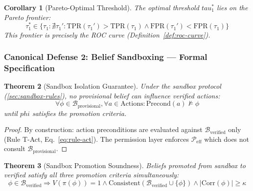 \documentclass[
]{article}
\newtheorem{theorem}{Theorem}[section]
\newtheorem{corollary}[theorem]{Corollary}
\begin{document}
\begin{corollary}[Pareto-Optimal Threshold]
\label{cor:pareto-threshold}
The optimal threshold $tau_1^*$ lies on the Pareto frontier:
\begin{equation}
\label{eq:pareto-threshold}
\tau_1^* \in \{\tau_1 : \nexists \tau_1': \text{TPR}(\tau_1') > \text{TPR}(\tau_1) \land \text{FPR}(\tau_1') < \text{FPR}(\tau_1)\}
\end{equation}
This frontier is precisely the ROC curve (Definition~\ref{def:roc-curve}).
\end{corollary}

\subsubsection{Canonical Defense 2: Belief Sandboxing --- Formal
Specification}\label{canonical-defense-2-belief-sandboxing-formal-specification}

\begin{theorem}[Sandbox Isolation Guarantee]
\label{thm:sandbox-isolation}
Under the sandbox protocol (\cref{sec:sandbox-rules}), no provisional belief can influence verified actions:
\begin{equation}
\label{eq:sandbox-isolation}
\forall \phi \in \mathcal{B}_{\text{provisional}}, \forall a \in \text{Actions}: \text{Precond}(a) \not\models \phi
\end{equation}
until $phi$ satisfies the promotion criteria.
\end{theorem}

\begin{proof}
By construction: action preconditions are evaluated against $\mathcal{B}_{\text{verified}}$ only (Rule T-Act, Eq.~\ref{eq:rule-act}). The permission layer enforces $\mathcal{P}_{\text{eff}}$ which does not consult $\mathcal{B}_{\text{provisional}}$.
\end{proof}

\begin{theorem}[Sandbox Promotion Soundness]
\label{thm:sandbox-soundness}
Beliefs promoted from sandbox to verified satisfy all three promotion criteria simultaneously:
\begin{equation}
\label{eq:sandbox-soundness}
\phi \in \mathcal{B}_{\text{verified}} \Rightarrow V(\pi(\phi)) = 1 \land \text{Consistent}(\mathcal{B}_{\text{verified}} \cup \{\phi\}) \land |\text{Corr}(\phi)| \geq \kappa
\end{equation}
\end{theorem}
\end{document}
